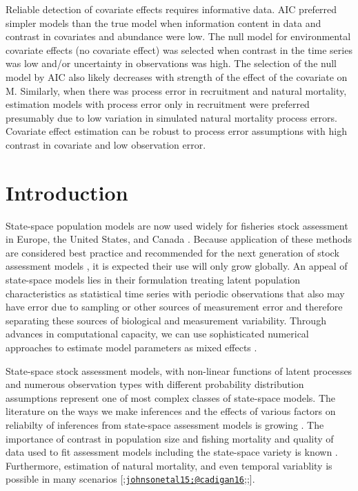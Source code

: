 \documentclass[
  12pt,
]{article}
\begin{document}
Reliable detection of covariate effects requires informative data. AIC preferred simpler models than the true model when information content in data and contrast in covariates and abundance were low. The null model for environmental covariate effects (no covariate effect) was selected when contrast in the time series was low and/or uncertainty in observations was high. The selection of the null model by AIC also likely decreases with strength of the effect of the covariate on M. Similarly, when there was process error in recruitment and natural mortality, estimation models with process error only in recruitment were preferred presumably due to low variation in simulated natural mortality process errors. Covariate effect estimation can be robust to process error assumptions with high contrast in covariate and low observation error.

\pagebreak

\hypertarget{introduction}{%
\section*{Introduction}\label{introduction}}

State-space population models are now used widely for fisheries stock assessment in Europe, the United States, and Canada \citep{nielsenberg14, cadigan16, pedersenberg17, stockmiller21}. Because application of these methods are considered best practice and recommended for the next generation of stock assessment models \citep{hoyleetal22, punt23}, it is expected their use will only grow globally. An appeal of state-space models lies in their formulation treating latent population characteristics as statistical time series with periodic observations that also may have error due to sampling or other sources of measurement error and therefore separating these sources of biological and measurement variability. Through advances in computational capacity, we can use sophisticated numerical approaches to estimate model parameters as mixed effects \citep{thorsonminto15, kristensenetal16}.

State-space stock assessment models, with non-linear functions of latent processes and numerous observation types with different probability distribution assumptions represent one of most complex classes of state-space models. The literature on the ways we make inferences and the effects of various factors on reliabilty of inferences from state-space assessment models is growing \citep{lietal24, milleretal_inreview1, cadiganetal}. The importance of contrast in population size and fishing mortality and quality of data used to fit assessment models including the state-space variety is known \citep{magnussonhilborn07, milleretal_inreview1}. Furthermore, estimation of natural mortality, and even temporal variablity is possible in many scenarios {[}\citet{leeetal11};\href{mailto:johnsonetal15;@cadigan16}{\nolinkurl{johnsonetal15;@cadigan16}};\citet{millerhyun18};\citet{milleretal_inreview1}{]}.
\end{document}
